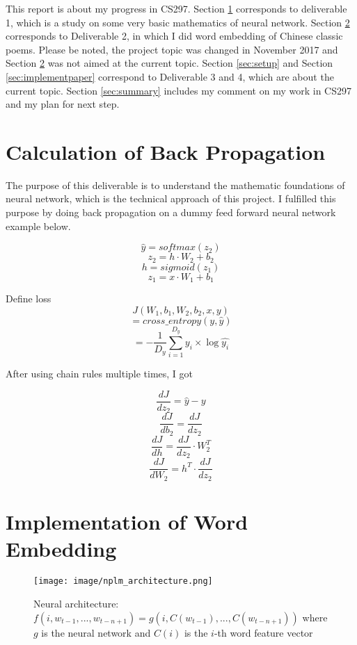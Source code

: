 \documentclass[12pt]{article}
\begin{document}
This report is about my progress in CS297. Section \ref{sec:calculation}  corresponds to deliverable 1, which is a study on some very basic mathematics of neural network. Section \ref{sec:embdding} corresponds to Deliverable 2, in which I did word embedding of Chinese classic poems. Please be noted, the project topic was changed in November 2017 and Section \ref{sec:embdding} was not aimed at the current topic. Section \ref{sec:setup} and Section \ref{sec:implementpaper} correspond to Deliverable 3 and 4, which are about the current topic. Section \ref{sec:summary} includes my comment on my work in CS297 and my plan for next step.

\break

\section{Calculation of Back Propagation}\label{sec:calculation}

The purpose of this deliverable is to understand the mathematic foundations of neural network, which is the technical approach of this project. I fulfilled this purpose by doing back propagation on a dummy feed forward neural network example below.

$$\hat{y}=softmax(z_2)$$
$$z_2=h\cdot W_2 + b_2$$
$$h=sigmoid(z_1)$$
$$z_1=x\cdot W_1+b_1$$

Define loss
$$J(W_1, b_1, W_2, b_2, x, y)$$
$$=cross\_entropy(y, \hat{y})$$
$$=-\frac{1}{D_y}\sum_{i=1}^{D_y}y_i \times \log{\hat{y_i}} $$

After using chain rules multiple times, I got

$$\frac{dJ}{dz_2}=\hat{y} - y$$
$$\frac{dJ}{db_2}=\frac{dJ}{dz_2}$$
$$\frac{dJ}{dh}=\frac{dJ}{dz_2}\cdot W_2^T$$
$$\frac{dJ}{dW_2}=h^T \cdot \frac{dJ}{dz_2}$$

\break

\section{Implementation of Word Embedding}\label{sec:embdding}

\begin{figure}[h]
\texttt{[image: image/nplm\_architecture.png]}
\centering
\caption{Neural architecture: $f(i,w_{t-1},... ,w_{t-n+1}) =g(i,C(w_{t-1}),... ,C(w_{t-n+1}))$ where $g$ is the neural network and $C(i)$ is the $i$-th word feature vector\cite{bengio2003neural}}
\label{fig:nplm}
\end{figure}
\end{document}
